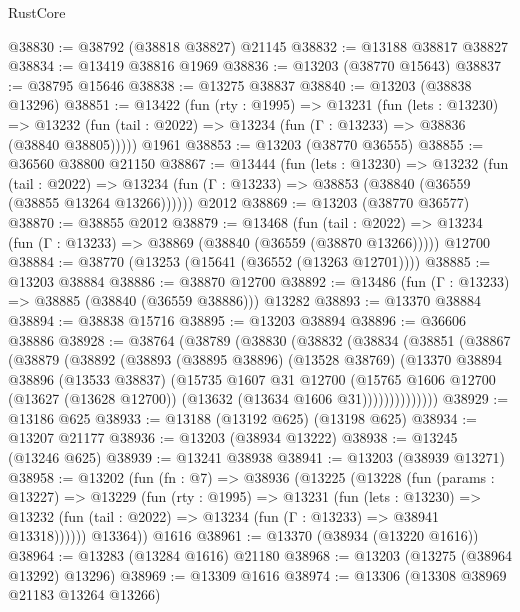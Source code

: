 \begin{lexlean}{RustCore}
\begin{coremodule}
@38830 := @38792 (@38818 @38827) @21145
@38832 := @13188 @38817 @38827
@38834 := @13419 @38816 @1969
@38836 := @13203 (@38770 @15643)
@38837 := @38795 @15646
@38838 := @13275 @38837
@38840 := @13203 (@38838 @13296)
@38851 := @13422
    (fun (rty : @1995) =>
    @13231
      (fun (lets : @13230) =>
      @13232 (fun (tail : @2022) => @13234 (fun (Γ : @13233) => @38836 (@38840 @38805)))))
    @1961
@38853 := @13203 (@38770 @36555)
@38855 := @36560 @38800 @21150
@38867 := @13444
    (fun (lets : @13230) =>
    @13232
      (fun (tail : @2022) =>
      @13234 (fun (Γ : @13233) => @38853 (@38840 (@36559 (@38855 @13264 @13266))))))
    @2012
@38869 := @13203 (@38770 @36577)
@38870 := @38855 @2012
@38879 := @13468
    (fun (tail : @2022) => @13234 (fun (Γ : @13233) => @38869 (@38840 (@36559 (@38870 @13266)))))
    @12700
@38884 := @38770 (@13253 (@15641 (@36552 (@13263 @12701))))
@38885 := @13203 @38884
@38886 := @38870 @12700
@38892 := @13486 (fun (Γ : @13233) => @38885 (@38840 (@36559 @38886))) @13282
@38893 := @13370 @38884
@38894 := @38838 @15716
@38895 := @13203 @38894
@38896 := @36606 @38886
@38928 := @38764
    (@38789
      (@38830
        (@38832
          (@38834
            (@38851
              (@38867
                (@38879
                  (@38892
                    (@38893
                      (@38895 @38896)
                      (@13528 @38769)
                      (@13370
                        @38894
                        @38896
                        (@13533 @38837)
                        (@15735
                          @1607
                          @31
                          @12700
                          (@15765
                            @1606
                            @12700
                            (@13627 (@13628 @12700))
                            (@13632 (@13634 @1606 @31))))))))))))))
@38929 := @13186 @625
@38933 := @13188 (@13192 @625) (@13198 @625)
@38934 := @13207 @21177
@38936 := @13203 (@38934 @13222)
@38938 := @13245 (@13246 @625)
@38939 := @13241 @38938
@38941 := @13203 (@38939 @13271)
@38958 := @13202
    (fun (fn : @7) =>
    @38936
      (@13225
        (@13228
          (fun (params : @13227) =>
          @13229
            (fun (rty : @1995) =>
            @13231
              (fun (lets : @13230) =>
              @13232 (fun (tail : @2022) => @13234 (fun (Γ : @13233) => @38941 @13318))))))
        @13364))
    @1616
@38961 := @13370 (@38934 (@13220 @1616))
@38964 := @13283 (@13284 @1616) @21180
@38968 := @13203 (@13275 (@38964 @13292) @13296)
@38969 := @13309 @1616
@38974 := @13306 (@13308 @38969 @21183 @13264 @13266)

\end{coremodule}
\end{lexlean}
